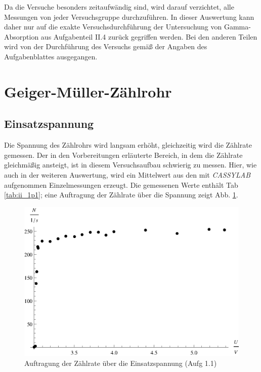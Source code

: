Da die Versuche besonders zeitaufwändig sind, wird darauf verzichtet, alle Messungen von jeder Versuchsgruppe durchzuführen. In dieser Auswertung kann daher nur auf die exakte Versuchsdurchführung der Untersuchung von Gamma-Absorption aus Aufgabenteil II.4 zurück gegriffen werden. Bei den anderen Teilen wird von der Durchführung des Versuchs gemäß der Angaben des Aufgabenblattes ausgegangen.

\section{Geiger-Müller-Zählrohr}
\subsection{Einsatzspannung}
Die Spannung des Zählrohrs wird langsam erhöht, gleichzeitig wird die Zählrate gemessen. Der in den Vorbereitungen erläuterte Bereich, in dem die Zählrate gleichmäßig ansteigt, ist in diesem Versuchsaufbau schwierig zu messen. Hier, wie auch in der weiteren Auswertung, wird ein Mittelwert aus den mit \textit{CASSYLAB} aufgenommen Einzelmessungen erzeugt. Die gemessenen Werte enthält Tab \ref{tab:ii_1p1}; eine Auftragung der Zählrate über die Spannung zeigt Abb. \ref{fig:ii_1p1}.

\begin{table}[tb]
	\centering
	\caption{Messung der Zählrate über die Einsatzspannung (Aufg 1.1)}
	\label{tab:ii_1p1}
	
\end{table}

\begin{figure}[tb]
	\centering
	\includegraphics[scale=1.0]{fig/ii_1p1.eps}
	\caption{Auftragung der Zählrate über die Einsatzspannung (Aufg 1.1)}
	\label{fig:ii_1p1}
\end{figure}

